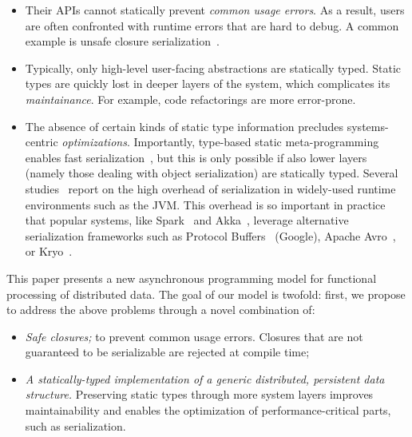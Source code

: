 \documentclass{easychair}
\begin{document}
\begin{itemize}

\item Their APIs cannot statically prevent \emph{common usage errors}. As a result, users are often
      confronted with runtime errors that are hard to debug. A common example is
      unsafe closure serialization~\cite{MillerHO14}.

\item Typically, only high-level user-facing abstractions are statically
      typed. Static types are quickly lost in deeper layers of the system,
      which complicates its \emph{maintainance}. For example, code refactorings
      are more error-prone.


\item The absence of certain kinds of static type information precludes systems-centric \emph{optimizations}.
      Importantly, type-based static meta-programming enables fast serialization~\cite{MillerHBO13}, but this is
      only possible if also lower layers (namely those dealing with object serialization) are statically typed.
      Several studies~\cite{Carpenter1999,Maassen1999,Philippsen2000,Welsh2000} report on the high
      overhead of serialization in widely-used runtime environments such as the JVM. This overhead is so
      important in practice that popular systems, like Spark~\cite{Zaharia2012} and Akka~\cite{Akka},
      leverage alternative serialization frameworks such as Protocol Buffers~\cite{Protobuf} (Google),
      Apache Avro~\cite{Avro}, or Kryo~\cite{Kryo}.

\end{itemize}

This paper presents a new asynchronous programming model for functional
processing of distributed data. The goal of our model is twofold: first, we
propose to address the above problems through a novel combination of:

\begin{itemize}

\item \emph{Safe closures;} to prevent common usage errors. Closures that are not
      guaranteed to be serializable are rejected at compile time;

\item \emph{A statically-typed implementation of a generic distributed, persistent data structure.}
      Preserving static types through more system layers improves maintainability and
      enables the optimization of performance-critical parts, such as serialization.

\end{itemize}
\end{document}
